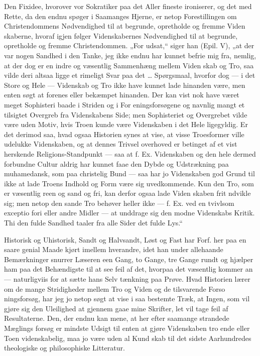 \documentclass[12pt]{book}
\newcommand{\opage}[1]{\marginnote{\footnotesize\textit{[#1]}}}
\begin{document}
Den Fixidee, hvorover vor Sokratiker paa det Aller\-%
fineste ironiserer, og det med Rette, da den endnu spøger
\opage{319}\setcounter{footnote}{0}%
i Saamanges Hjerne, er netop Forestillingen om Christendommens
Nødvendighed til at begrunde, opretholde og fremme Viden\-%
skaberne, hvoraf igjen følger Videnskabernes Nødvendighed
til at begrunde, opretholde og fremme Christendommen. „For\-%
udsat,“ siger han (Epil. V), „at der var nogen Sandhed i den
Tanke, jeg ikke endnu har kunnet befrie mig fra, nemlig, at
der dog er en indre og væsentlig Sammenhæng mellem Viden\-%
skab og Tro, saa vilde deri altsaa ligge et rimeligt Svar paa
det \ldots{} Spørgsmaal, hvorfor dog --- i det Store og Hele ---
Videnskab og Tro ikke have kunnet lade hinanden være, men
enten søgt at forenes eller bekæmpet hinanden. Der kan vist\-%
nok have været meget Sophisteri baade i Striden og i For\-%
eningsforsøgene og navnlig mangt et tilsigtet Overgreb fra
Videnskabens Side; men Sophisteriet og Overgrebet vilde være
uden Motiv, hvis Troen kunde være Videnskaben i det Hele
ligegyldig. Er det derimod saa, hvad ogsaa Historien synes
at vise, at visse Troesformer ville udelukke Videnskaben, og
at dennes Trivsel overhoved er betinget af et vist herskende
Religions-Standpunkt --- saa at f. Ex. Videnskaben og den
hele dermed forbundne Cultur aldrig har kunnet faae den Dybde
og Udstrækning paa muhamedansk, som paa christelig Bund --- saa
har jo Videnskaben god Grund til ikke at lade Troens Indhold
og Form være sig uvedkommende. Kun den Tro, som er
væsentlig reen og sand og fri, kan derfor ogsaa lade Viden\-%
skaben frit ndvikle sig; men netop den sande Tro behøver
heller ikke --- f. Ex. ved en tvivlsom exceptio fori eller andre
Midler --- at unddrage sig den modne Videnskabs Kritik.
Thi den fulde Sandhed taaler fra alle Sider det fulde Lys.“

Historisk og Uhistorisk, Sandt og Halvsandt, Løst og
Fast har Forf. her paa en saare genial Maade kjørt imellem
hverandre, idet han under allehaande Bemærkninger snurrer
Læseren een Gang, to Gange, tre Gange rundt og hjælper
ham paa det Behændigste til at see feil af det, hvorpaa det
væsentlig kommer an --- naturligviis for at sætte hans Selv\-%
\opage{320}\setcounter{footnote}{0}%
tænkning paa Prøve. Hvad Historien lærer om de mange
Stridigheder mellem Tro og Viden og de tilsvarende Forso\-%
ningsforsøg, har jeg jo netop søgt at vise i saa bestemte
Træk, at Ingen, som vil gjøre sig den Uleilighed at gjennem\-%
gaae mine Skrifter, let vil tage feil af Resultaterne. Den, der
endnu kan mene, at her efter saamange strandede Mæglings\-%
forsøg er mindste Udsigt til enten at gjøre Videnskaben tro\-%
ende eller Toen videnskabelig, maa jo være uden al Kund\-%
skab til det sidste Aarhundredes theologiske og philosophiske
Litteratur.
\end{document}
